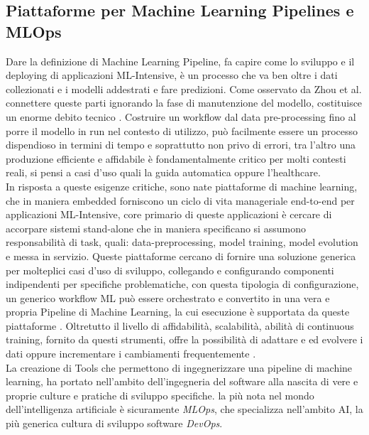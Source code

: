 \subsection{Piattaforme per Machine Learning Pipelines e MLOps}
Dare la definizione di Machine Learning Pipeline, fa capire come lo sviluppo e il deploying di applicazioni ML-Intensive, è un processo che va ben oltre i dati collezionati e i modelli addestrati e fare predizioni. Come osservato da Zhou et al. connettere queste parti ignorando la fase di manutenzione del modello, costituisce un enorme debito tecnico \cite{MLOps}. Costruire un workflow dal data pre-processing fino al porre il modello in run nel contesto di utilizzo, può facilmente essere un processo dispendioso in termini di tempo e soprattutto non privo di errori, tra l'altro una produzione efficiente e affidabile è fondamentalmente critico per molti contesti reali, si pensi a casi d'uso quali la guida automatica oppure l'healthcare\cite{MLOps}. \\

In risposta a queste esigenze critiche, sono nate piattaforme di machine learning, che in maniera embedded forniscono un ciclo di vita manageriale end-to-end per applicazioni ML-Intensive, core primario di queste applicazioni è cercare di accorpare sistemi stand-alone che in maniera specificano si assumono responsabilità di task, quali: data-preprocessing, model training, model evolution e messa in servizio. Queste piattaforme cercano di fornire una soluzione generica per molteplici casi d'uso di sviluppo, collegando e configurando componenti indipendenti per specifiche problematiche, con questa tipologia di configurazione, un generico workflow ML può essere orchestrato e convertito in una vera e propria Pipeline di Machine Learning, la cui esecuzione è supportata da queste piattaforme \cite{MLOps}. Oltretutto il livello di affidabilità, scalabilità, abilità di continuous training, fornito da questi strumenti, offre la possibilità di adattare e ed evolvere i dati oppure incrementare i cambiamenti frequentemente \cite{MLOps}.\\

La creazione di Tools che permettono di ingegnerizzare una pipeline di machine learning, ha portato nell'ambito dell'ingegneria del software alla nascita di vere e proprie culture e pratiche di sviluppo specifiche. la più nota nel mondo dell'intelligenza artificiale è sicuramente \emph{MLOps}, che specializza nell'ambito AI, la più generica cultura di sviluppo software \emph{DevOps}. 

